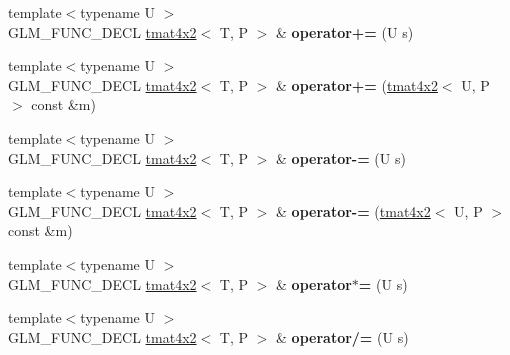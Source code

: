\begin{DoxyCompactItemize}
\item 
\mbox{\label{structglm_1_1tmat4x2_afae8ddc6077db543d0b08537c38ea994}} 
{\footnotesize template$<$typename U $>$ }\\G\+L\+M\+\_\+\+F\+U\+N\+C\+\_\+\+D\+E\+CL \hyperlink{structglm_1_1tmat4x2}{tmat4x2}$<$ T, P $>$ \& {\bfseries operator+=} (U s)
\item 
\mbox{\label{structglm_1_1tmat4x2_ac80744038a97a57534282a1fc7ed6a08}} 
{\footnotesize template$<$typename U $>$ }\\G\+L\+M\+\_\+\+F\+U\+N\+C\+\_\+\+D\+E\+CL \hyperlink{structglm_1_1tmat4x2}{tmat4x2}$<$ T, P $>$ \& {\bfseries operator+=} (\hyperlink{structglm_1_1tmat4x2}{tmat4x2}$<$ U, P $>$ const \&m)
\item 
\mbox{\label{structglm_1_1tmat4x2_ab687cc5fd68c36a44990b257b5413b14}} 
{\footnotesize template$<$typename U $>$ }\\G\+L\+M\+\_\+\+F\+U\+N\+C\+\_\+\+D\+E\+CL \hyperlink{structglm_1_1tmat4x2}{tmat4x2}$<$ T, P $>$ \& {\bfseries operator-\/=} (U s)
\item 
\mbox{\label{structglm_1_1tmat4x2_a370c6855d2279fdd725e9d98589bc886}} 
{\footnotesize template$<$typename U $>$ }\\G\+L\+M\+\_\+\+F\+U\+N\+C\+\_\+\+D\+E\+CL \hyperlink{structglm_1_1tmat4x2}{tmat4x2}$<$ T, P $>$ \& {\bfseries operator-\/=} (\hyperlink{structglm_1_1tmat4x2}{tmat4x2}$<$ U, P $>$ const \&m)
\item 
\mbox{\label{structglm_1_1tmat4x2_a5ee545b358066226c5ad692deff6fea2}} 
{\footnotesize template$<$typename U $>$ }\\G\+L\+M\+\_\+\+F\+U\+N\+C\+\_\+\+D\+E\+CL \hyperlink{structglm_1_1tmat4x2}{tmat4x2}$<$ T, P $>$ \& {\bfseries operator$\ast$=} (U s)
\item 
\mbox{\label{structglm_1_1tmat4x2_a249db7437c8109b32811b84b543d97a5}} 
{\footnotesize template$<$typename U $>$ }\\G\+L\+M\+\_\+\+F\+U\+N\+C\+\_\+\+D\+E\+CL \hyperlink{structglm_1_1tmat4x2}{tmat4x2}$<$ T, P $>$ \& {\bfseries operator/=} (U s)
\item 
\mbox{\label{structglm_1_1tmat4x2_aa4dfd99c24f9e86e7b3de9c0a2cb99ab}} 

\end{DoxyCompactItemize}
